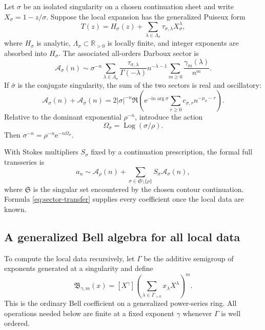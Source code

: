 \documentclass[11pt]{article}
\theoremstyle{definition}
\theoremstyle{remark}
\newcommand{\e}{\mathrm e}
\newcommand{\ii}{\mathrm i}
\newcommand{\Log}{\operatorname{Log}}
\newcommand{\R}{\mathbb R}
\begin{document}
Let $\sigma$ be an isolated singularity on a chosen continuation sheet and
write $X_\sigma=1-z/\sigma$.  Suppose the local expansion has the generalized
Puiseux form
\begin{equation}
 T(z)=H_\sigma(z)+
 \sum_{\lambda\in\Lambda_\sigma}
 \tau_{\sigma,\lambda}X_\sigma^\lambda,
 \label{eq:general-local-sector}
\end{equation}
where $H_\sigma$ is analytic, $\Lambda_\sigma\subset\R_{>0}$ is locally
finite, and integer exponents are absorbed into $H_\sigma$.  The associated
all-orders Darboux sector is
\begin{equation}
 \boxed{
 \mathcal A_\sigma(n)\sim
 \sigma^{-n}\sum_{\lambda\in\Lambda_\sigma}
 \frac{\tau_{\sigma,\lambda}}{\Gamma(-\lambda)}
 n^{-\lambda-1}
 \sum_{m\geq0}\frac{\gamma_m(\lambda)}{n^m}.}
 \label{eq:sector-transfer}
\end{equation}
If $\bar\sigma$ is the conjugate singularity, the sum of the two sectors is
real and oscillatory:
\begin{equation}
 \mathcal A_\sigma(n)+\mathcal A_{\bar\sigma}(n)
 =2|\sigma|^{-n}\Re\!\left(
   \e^{-\ii n\arg\sigma}
   \sum_{r\geq0}c_{\sigma,r}n^{-\mu_\sigma-r}
 \right).
 \label{eq:conjugate-sector}
\end{equation}
Relative to the dominant exponential $\rho^{-n}$, introduce the action
\begin{equation}
 \Omega_\sigma=\Log(\sigma/\rho).
 \label{eq:action}
\end{equation}
Then $\sigma^{-n}=\rho^{-n}\e^{-n\Omega_\sigma}$.

With Stokes multipliers $S_\sigma$ fixed by a continuation prescription, the
formal full transseries is
\begin{equation}
 a_n\sim \mathcal A_\rho(n)
 +\sum_{\sigma\in\mathfrak S\setminus\{\rho\}}
 S_\sigma\mathcal A_\sigma(n),
 \label{eq:full-forward-transseries}
\end{equation}
where $\mathfrak S$ is the singular set encountered by the chosen contour
continuation.  Formula \cref{eq:sector-transfer} supplies every coefficient
once the local data are known.

\subsection{A generalized Bell algebra for all local data}

To compute the local data recursively, let $\Gamma$ be the additive semigroup
of exponents generated at a singularity and define
\begin{equation}
 \mathfrak B_{\gamma,m}(x)
 =[X^\gamma]\left(\sum_{\lambda\in\Gamma_{>0}}
 x_\lambda X^\lambda\right)^m.
 \label{eq:generalized-bell}
\end{equation}
This is the ordinary Bell coefficient on a generalized power-series ring.
All operations needed below are finite at a fixed exponent $\gamma$ whenever
$\Gamma$ is well ordered.
\end{document}
